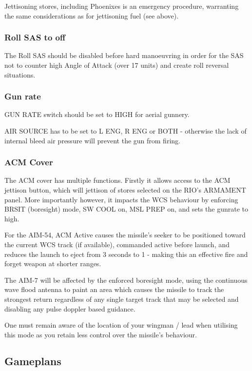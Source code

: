 Jettisoning stores, including Phoenixes is an emergency procedure, warranting
the same considerations as for jettisoning fuel (see above).

\subsubsection*{Roll SAS to off}

The Roll SAS should be disabled before hard manoeuvring in order for the SAS
not to counter high Angle of Attack (over 17 units) and create roll reversal
situations.

\subsubsection*{Gun rate}

GUN RATE switch should be set to HIGH for aerial gunnery.

AIR SOURCE has to be set to L ENG, R ENG or BOTH - otherwise the lack of
internal bleed air pressure will prevent the gun from firing.

\subsubsection*{ACM Cover}

The ACM cover has multiple functions. Firstly it allows access to the ACM
jettison button, which will jettison of stores selected on the RIO’s ARMAMENT
panel. More importantly however, it impacts the WCS behaviour by enforcing
BRSIT (boresight) mode, SW COOL on, MSL PREP on, and sets the gunrate to high.

For the AIM-54, ACM Active causes the missile's seeker to be positioned toward
the current WCS track (if available), commanded active before launch, and
reduces the launch to eject from 3 seconds to 1 - making this an effective fire
and forget weapon at shorter ranges.

The AIM-7 will be affected by the enforced boresight mode, using the continuous
wave flood antenna to paint an area which causes the missile to track the
strongest return regardless of any single target track that may be selected and
disabling any pulse doppler based guidance.

One must remain aware of the location of your wingman / lead when utilising
this mode as you retain less control over the missile's behaviour.

\subsection{Gameplans}

